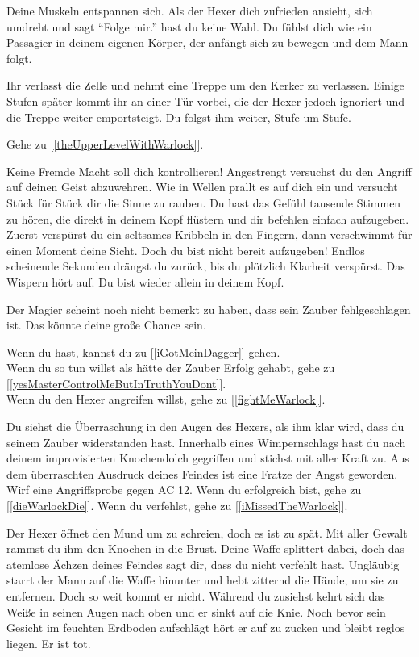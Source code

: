 Deine Muskeln entspannen sich. Als der Hexer dich zufrieden ansieht, sich umdreht und sagt ``Folge mir.'' hast du keine Wahl. Du fühlst dich wie ein Passagier in deinem eigenen Körper, der anfängt sich zu bewegen und dem Mann folgt.

Ihr verlasst die Zelle und nehmt eine Treppe um den Kerker zu verlassen. Einige Stufen später kommt ihr an einer Tür vorbei, die der Hexer jedoch ignoriert und die Treppe weiter emportsteigt. Du folgst ihm weiter, Stufe um Stufe.

Gehe zu [\ref{theUpperLevelWithWarlock}].


Keine Fremde Macht soll dich kontrollieren! Angestrengt versuchst du den Angriff auf deinen Geist abzuwehren. Wie in Wellen prallt es auf dich ein und versucht Stück für Stück dir die Sinne zu rauben. Du hast das Gefühl tausende Stimmen zu hören, die direkt in deinem Kopf flüstern und dir befehlen einfach aufzugeben. Zuerst verspürst du ein seltsames Kribbeln in den Fingern, dann verschwimmt für einen Moment deine Sicht. Doch du bist nicht bereit aufzugeben! Endlos scheinende Sekunden drängst du zurück, bis du plötzlich Klarheit verspürst. Das Wispern hört auf. Du bist wieder allein in deinem Kopf.

Der Magier scheint noch nicht bemerkt zu haben, dass sein Zauber fehlgeschlagen ist. Das könnte deine große Chance sein.

Wenn du  hast, kannst du zu [\ref{iGotMeinDagger}] gehen.
\\Wenn du so tun willst als hätte der Zauber Erfolg gehabt, gehe zu [\ref{yesMasterControlMeButInTruthYouDont}].
\\Wenn du den Hexer angreifen willst, gehe zu [\ref{fightMeWarlock}].


Du siehst die Überraschung in den Augen des Hexers, als ihm klar wird, dass du seinem Zauber widerstanden hast. Innerhalb eines Wimpernschlags hast du nach deinem improvisierten Knochendolch gegriffen und stichst mit aller Kraft zu. Aus dem überraschten Ausdruck deines Feindes ist eine Fratze der Angst geworden.
Wirf eine Angriffsprobe gegen AC 12. Wenn du erfolgreich bist, gehe zu [\ref{dieWarlockDie}]. Wenn du verfehlst, gehe zu [\ref{iMissedTheWarlock}].


Der Hexer öffnet den Mund um zu schreien, doch es ist zu spät. Mit aller Gewalt rammst du ihm den Knochen in die Brust. Deine Waffe splittert dabei, doch das atemlose Ächzen deines Feindes sagt dir, dass du nicht verfehlt hast. Ungläubig starrt der Mann auf die Waffe hinunter und hebt zitternd die Hände, um sie zu entfernen. Doch so weit kommt er nicht. Während du zusiehst kehrt sich das Weiße in seinen Augen nach oben und er sinkt auf die Knie. Noch bevor sein Gesicht im feuchten Erdboden aufschlägt hört er auf zu zucken und bleibt reglos liegen. Er ist tot.

